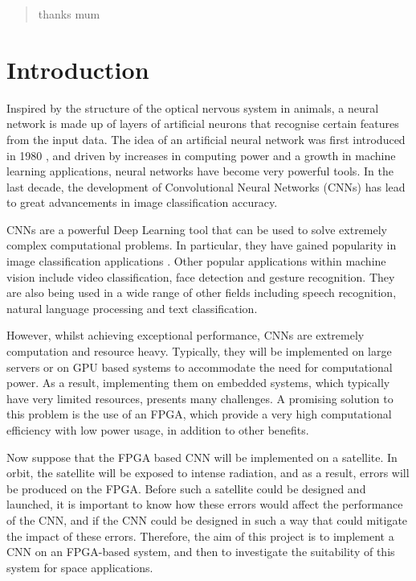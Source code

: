 \documentclass[12pt]{article}
\begin{document}
\newpage

\renewcommand{\abstractname}{Acknowledgements}
\begin{abstract}
thanks mum
\end{abstract}

\newpage

\tableofcontents

\newpage

\section{Introduction}
\label{sec:Intro}
\vspace{-12pt}

Inspired by the structure of the optical nervous system in animals, a neural network is made up of layers of artificial neurons that recognise certain features from the input data. The idea of an artificial neural network was first introduced in 1980 \cite{neocognitron}, and driven by increases in computing power and a growth in machine learning applications, neural networks have become very powerful tools. In the last decade, the development of Convolutional Neural Networks (CNNs) has lead to great advancements in image classification accuracy.

CNNs are a powerful Deep Learning tool that can be used to solve extremely complex computational problems. In particular, they have gained popularity in image classification applications \cite{ImageNetChallenge}. Other popular applications within machine vision include video classification, face detection and gesture recognition. They are also being used in a wide range of other fields including speech recognition, natural language processing and text classification.

However, whilst achieving exceptional performance, CNNs are extremely computation and resource heavy. Typically, they will be implemented on large servers or on GPU based systems to accommodate the need for computational power. As a result, implementing them on embedded systems, which typically have very limited resources, presents many challenges. A promising solution to this problem is the use of an FPGA, which provide a very high computational efficiency with low power usage, in addition to other benefits.

Now suppose that the FPGA based CNN will be implemented on a satellite. In orbit, the satellite will be exposed to intense radiation, and as a result, errors will be produced on the FPGA. Before such a satellite could be designed and launched, it is important to know how these errors would affect the performance of the CNN, and if the CNN could be designed in such a way that could mitigate the impact of these errors. Therefore, the aim of this project is to implement a CNN on an FPGA-based system, and then to investigate the suitability of this system for space applications.
\end{document}
